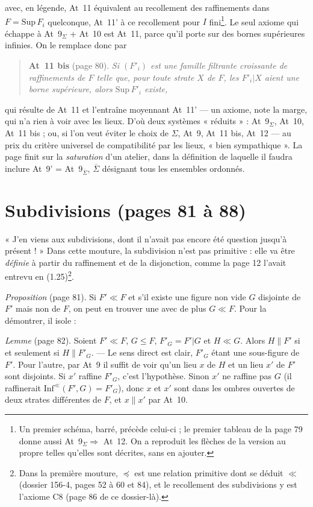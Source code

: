\documentclass[11pt,a4paper]{article}
\begin{document}
avec, en légende, At~11 équivalent au recollement des raffinements dans $F =
\mathrm{Sup}\,F_{i}$ quelconque, At~11' à ce recollement pour $I$
fini\footnote{Un premier schéma, barré, précède celui-ci ; le premier tableau de
la page 79 donne aussi At~9$_{\Sigma} \Rightarrow$ At~12. On a reproduit les
flèches de la version au propre telles qu'elles sont décrites, sans en ajouter.}.
Le seul axiome qui échappe à At~9$_{\Sigma}$ + At~10 est At~11, parce qu'il
porte sur des bornes supérieures infinies. On le remplace donc par

\begin{quote}
\textbf{At~11 bis} (page 80). \emph{Si $(F'_{i})$ est une famille filtrante
croissante de raffinements de $F$ telle que, pour toute strate $X$ de $F$, les
$F'_{i}|X$ aient une borne supérieure, alors $\mathrm{Sup}\,F'_{i}$ existe,}
\end{quote}
qui résulte de At~11 et l'entraîne moyennant At~11' --- un axiome, note la
marge, qui n'a rien à voir avec les lieux. D'où deux systèmes « réduits » :
At~9$_{\Sigma}$, At~10, At~11 bis ; ou, si l'on veut éviter le choix de
$\Sigma$, At~9, At~11 bis, At~12 --- au prix du critère universel de
compatibilité par les lieux, « bien sympathique ». La page finit sur la
\emph{saturation} d'un atelier, dans la définition de laquelle il faudra inclure
At~9' = At~9$_{\overline{\Sigma}}$, $\overline{\Sigma}$ désignant tous les
ensembles ordonnés.

\section*{Subdivisions (pages 81 à 88)}

« J'en viens aux subdivisions, dont il n'avait pas encore été question jusqu'à
présent ! » Dans cette mouture, la subdivision n'est pas primitive : elle va
être \emph{définie} à partir du raffinement et de la disjonction, comme la page 12
l'avait entrevu en (1.25)\footnote{Dans la première mouture, $\preccurlyeq$ est
une relation primitive dont se déduit $\ll$ (dossier 156-4, pages 52 à 60 et 84),
et le recollement des subdivisions y est l'axiome C8 (page 86 de ce
dossier-là).}.

\emph{Proposition} (page 81). Si $F' \ll F$ et s'il existe une figure non vide
$G$ disjointe de $F'$ mais non de $F$, on peut en trouver une avec de plus $G \ll
F$. Pour la démontrer, il isole :

\emph{Lemme} (page 82). Soient $F' \ll F$, $G \leq F$, $F'_{G} = F'|G$ et $H \ll
G$. Alors $H \parallel F'$ si et seulement si $H \parallel F'_{G}$. --- Le sens
direct est clair, $F'_{G}$ étant une sous-figure de $F'$. Pour l'autre, par At~9
il suffit de voir qu'un lieu $x$ de $H$ et un lieu $x'$ de $F'$ sont disjoints.
Si $x'$ raffine $F'_{G}$, c'est l'hypothèse. Sinon $x'$ ne raffine pas $G$ (il
raffinerait $\mathrm{Inf}^{\ll}(F', G) = F'_{G}$), donc $x$ et $x'$ sont dans
les ombres ouvertes de deux strates différentes de $F$, et $x \parallel x'$ par
At~10.
\end{document}
